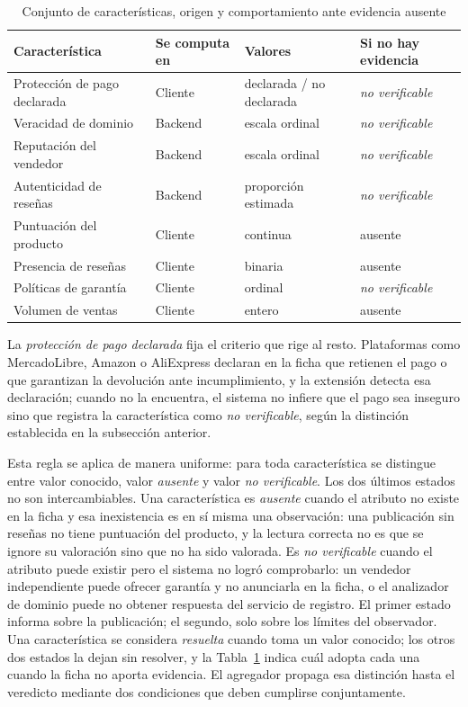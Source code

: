 \begin{table}[t]
\caption{Conjunto de características, origen y comportamiento ante evidencia ausente}
\label{tab:senales}
\centering
\footnotesize
\setlength{\tabcolsep}{3pt}
\renewcommand{\arraystretch}{1.15}
\begin{tabular}{@{}p{2.05cm}p{1.35cm}p{1.7cm}p{2.1cm}@{}}
\toprule
\textbf{Característica} & \textbf{Se computa en} & \textbf{Valores} & \textbf{Si no hay evidencia} \\
\midrule
Protección de pago declarada & Cliente & declarada / no declarada & \textit{no verificable} \\
Veracidad de dominio & Backend & escala ordinal & \textit{no verificable} \\
Reputación del vendedor & Backend & escala ordinal & \textit{no verificable} \\
Autenticidad de reseñas & Backend & proporción estimada & \textit{no verificable} \\
Puntuación del producto & Cliente & continua & ausente \\
Presencia de reseñas & Cliente & binaria & ausente \\
Políticas de garantía & Cliente & ordinal & \textit{no verificable} \\
Volumen de ventas & Cliente & entero & ausente \\
\bottomrule
\end{tabular}
\end{table}

La \emph{protección de pago declarada} fija el criterio que rige al resto. Plataformas como
MercadoLibre, Amazon o AliExpress declaran en la ficha que retienen el pago o que garantizan
la devolución ante incumplimiento, y la extensión detecta esa declaración; cuando no la
encuentra, el sistema no infiere que el pago sea inseguro sino que registra la característica
como \emph{no verificable}, según la distinción establecida en la subsección anterior.

Esta regla se aplica de manera uniforme: para toda característica se distingue entre valor
conocido, valor \emph{ausente} y valor \emph{no verificable}. Los dos últimos estados no son
intercambiables. Una característica es \emph{ausente} cuando el atributo no existe en la ficha
y esa inexistencia es en sí misma una observación: una publicación sin reseñas no tiene
puntuación del producto, y la lectura correcta no es que se ignore su valoración sino que no
ha sido valorada. Es \emph{no verificable} cuando el atributo puede existir pero el sistema no
logró comprobarlo: un vendedor independiente puede ofrecer garantía y no anunciarla en la
ficha, o el analizador de dominio puede no obtener respuesta del servicio de registro. El
primer estado informa sobre la publicación; el segundo, solo sobre los límites del observador.
Una característica se considera \emph{resuelta} cuando toma un valor conocido; los otros dos
estados la dejan sin resolver, y la Tabla~\ref{tab:senales} indica cuál adopta cada una cuando
la ficha no aporta evidencia. El agregador propaga esa distinción hasta el veredicto
mediante dos condiciones que deben cumplirse conjuntamente.

